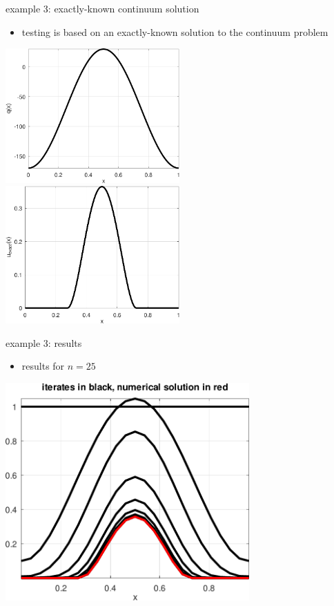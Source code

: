 \documentclass[10pt,hyperref]{beamer}
\begin{document}
\begin{frame}{example 3: exactly-known continuum solution}

\begin{itemize}
\item testing is based on an exactly-known solution to the continuum problem
\end{itemize}

\medskip
\noindent
\hspace{-5mm}
\mbox{\includegraphics[width=0.5\textwidth]{figs/qobstacle.pdf} \qquad \includegraphics[width=0.5\textwidth]{figs/uexactobstacle.pdf}}
\end{frame}


\begin{frame}{example 3: results}

\begin{itemize}
\item results for $n=25$
\end{itemize}

\medskip
\begin{center}
\includegraphics[width=0.7\textwidth]{figs/iteratesobstacle.pdf}
\end{center}
\end{frame}
\end{document}
